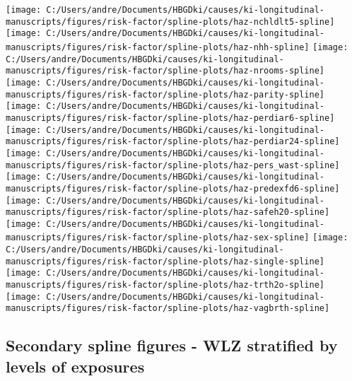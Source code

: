 \documentclass[
  9pt,
]{book}
\begin{document}
\texttt{[image: C:/Users/andre/Documents/HBGDki/causes/ki-longitudinal-manuscripts/figures/risk-factor/spline-plots/haz-nchldlt5-spline]}
\texttt{[image: C:/Users/andre/Documents/HBGDki/causes/ki-longitudinal-manuscripts/figures/risk-factor/spline-plots/haz-nhh-spline]}
\texttt{[image: C:/Users/andre/Documents/HBGDki/causes/ki-longitudinal-manuscripts/figures/risk-factor/spline-plots/haz-nrooms-spline]}
\texttt{[image: C:/Users/andre/Documents/HBGDki/causes/ki-longitudinal-manuscripts/figures/risk-factor/spline-plots/haz-parity-spline]}
\texttt{[image: C:/Users/andre/Documents/HBGDki/causes/ki-longitudinal-manuscripts/figures/risk-factor/spline-plots/haz-perdiar6-spline]}
\texttt{[image: C:/Users/andre/Documents/HBGDki/causes/ki-longitudinal-manuscripts/figures/risk-factor/spline-plots/haz-perdiar24-spline]}
\texttt{[image: C:/Users/andre/Documents/HBGDki/causes/ki-longitudinal-manuscripts/figures/risk-factor/spline-plots/haz-pers\_wast-spline]}
\texttt{[image: C:/Users/andre/Documents/HBGDki/causes/ki-longitudinal-manuscripts/figures/risk-factor/spline-plots/haz-predexfd6-spline]}
\texttt{[image: C:/Users/andre/Documents/HBGDki/causes/ki-longitudinal-manuscripts/figures/risk-factor/spline-plots/haz-safeh20-spline]}
\texttt{[image: C:/Users/andre/Documents/HBGDki/causes/ki-longitudinal-manuscripts/figures/risk-factor/spline-plots/haz-sex-spline]}
\texttt{[image: C:/Users/andre/Documents/HBGDki/causes/ki-longitudinal-manuscripts/figures/risk-factor/spline-plots/haz-single-spline]}
\texttt{[image: C:/Users/andre/Documents/HBGDki/causes/ki-longitudinal-manuscripts/figures/risk-factor/spline-plots/haz-trth2o-spline]}
\texttt{[image: C:/Users/andre/Documents/HBGDki/causes/ki-longitudinal-manuscripts/figures/risk-factor/spline-plots/haz-vagbrth-spline]}

\hypertarget{secondary-spline-figures---wlz-stratified-by-levels-of-exposures}{%
\subsection{Secondary spline figures - WLZ stratified by levels of exposures}\label{secondary-spline-figures---wlz-stratified-by-levels-of-exposures}}
\end{document}
